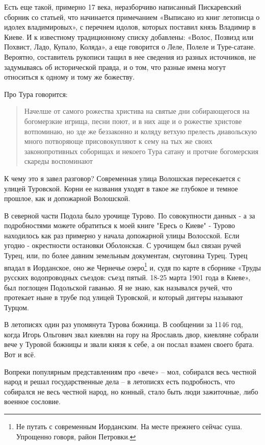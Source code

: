 \documentclass[a5paper,11pt,openany]{article}
\begin{document}
Есть еще такой, примерно 17 века, неразборчиво написанный Пискаревский сборник со статьей, что начинается примечанием «Выписано из книг летописца о идолех владимировых», с перечнем идолов, которых поставил князь Владимир в Киеве. И к известному традиционному списку добавлены: «Волос, Позвизд или Похвист, Ладо, Купало, Коляда», а еще говорится о Леле, Полеле и Туре-сатане. Вероятно, составитель рукописи тащил в нее сведения из разных источников, не задумываясь об исторической правда, и о том, что разные имена могут относиться к одному и тому же божеству. 

   Про Тура говорится: 

\begin{quotation}
\noindent Начелше от самого рожества христива на святые дни собирающегося на богомерзкие игрища, песни поют, и в них аще и о рожестве христове вотпоминаю, но зде же беззаконно и коляду ветхую прелесть диавольскую много потворяюще присовокупляют к сему на тых же своих законопротивных соборищах и некоего Тура сатану и протчие богомерския скареды воспоминают
\end{quotation}

    К чему это я завел разговор? Современная улица Волошская пересекается с улицей Туровской. Корни ее названия уходят в такое же глубокое и темное прошлое, как и допожарной Волошской.


   В северной части Подола было урочище Турово. По совокупности данных - а за подробностями можете обратиться к моей книге "Ересь о Киеве" - Турово находилось как раз примерно у начала допожарной улицы Волосской. Если угодно - окрестности остановки Оболонская. С урочищем был связан ручей Турец, или, по более давним земельным документам, смуговина Турец. Турец впадал в Иорданское, оно же Чернечье озеро\footnote{Не путать с современным Иорданским. На месте прежнего сейчас суша. Упрощенно говоря, район Петровки.} и, судя по карте в сборнике «Труды русских водопроводных съездов: съезд пятый. 18-25 марта 1901 года в Киеве», был поглощен Подольской гаванью. Я не знаю, как назывался ручей, что протекает ныне в трубе под улицей Туровской, и который диггеры называют Турцом.

  В летописях один раз упомянута Турова божница. В сообщении за 1146 год, когда Игорь Ольгович звал киевлян на гору на Ярославль двор, киевляне собрали вече у Туровой  божницы и звали князя к себе, а он послал взамен своего брата. Вот и всё.

   Вопреки популярным представлениям про «вече» – мол, собирался весь честной народ и решал государственные дела – в летописях есть подробность, что собирался не весь честной народ, но конный, стало быть люди зажиточные, либо военное сословие.
\end{document}

